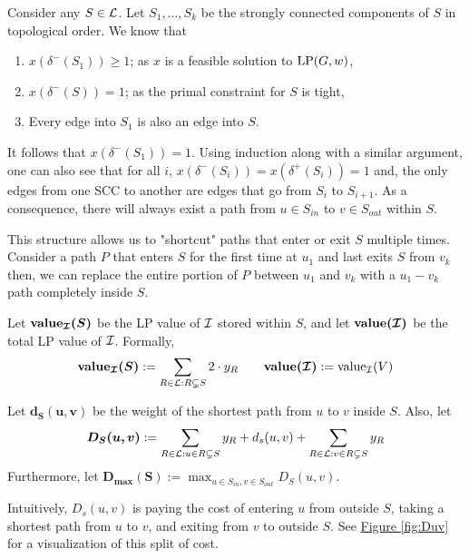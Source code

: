 
	Consider any $S\in \mathcal{L}$. Let $S_1,\dots, S_k$ be the strongly connected components of $S$ in topological order. 
	We know that
	\begin{enumerate}
		\item $x(\delta^-(S_1)) \geq 1$; as $x$ is a feasible solution to $\textup{LP}(G,w)$,
		\item $x(\delta^-(S)) = 1$; as the primal constraint for $S$ is tight,
		\item Every edge into $S_1$ is also an edge into $S$.
	\end{enumerate}
	It follows that $x(\delta^-(S_1)) = 1$. 
	Using induction along with a similar argument, one can also see that for all $i$, $x(\delta^-(S_i)) = x(\delta^+(S_i)) = 1$ and, the only edges from one SCC to another are edges that go from $S_i$ to $S_{i + 1}$. 
	As a consequence, there will always exist a path from $u\in S_{in}$ to $v\in S_{out}$ within $S$.
	
	This structure allows us to "shortcut" paths that enter or exit $S$ multiple times. Consider a path $P$ that enters $S$ for the first time at $u_1$ and last exits $S$ from $v_k$ then, we can replace the entire portion of $P$ between $u_1$ and $v_k$ with a $u_1 - v_k$ path completely inside $S$.\\
	
	
	\begin{definition}\label{def:value}
		Let $\bm{\textbf{\textup{value}}_{\mathcal{I}}(S)}$ be the LP value of $\mathcal{I}$ stored within $S$, and let $\bm{\textbf{\textup{value}}(\mathcal{I})}$ be the total LP value of $\mathcal{I}$. Formally, 
		\[
			\bm{\textbf{\textup{value}}_{\mathcal{I}}(S)}:=\sum\limits_{R\in \mathcal{L}:R\subsetneq S}2\cdot y_R\qquad \bm{\textbf{\textup{value}}(\mathcal{I})}:=\textup{value}_{\mathcal{I}}(V)
		\]
	\end{definition}
	
	\begin{definition} 
		Let $\bm{d_S(u,v)}$ be the weight of the shortest path from $u$ to $v$ inside $S$. Also, let 
		\begin{equation}
			\bm{D_S(u,v)}:=\sum_{R\in \mathcal{L} : u\in R\subsetneq S}y_R + d_s(u,v) + \sum_{R\in \mathcal{L} : v\in R\subsetneq S}y_R\label{def:1}
		\end{equation}
		Furthermore, let $\bm{D_{\max}(S)} := \max_{u \in S_{in}, v \in S_{out}}D_S(u,v)$.
		
		Intuitively, $D_s(u,v)$ is paying the cost of entering $u$ from outside $S$, taking a shortest path from $u$ to $v$, and exiting from $v$ to outside $S$. See \hyperref[fig:Duv]{Figure \ref{fig:Duv}} for a visualization of this split of cost.\\
	\end{definition}
	
	
